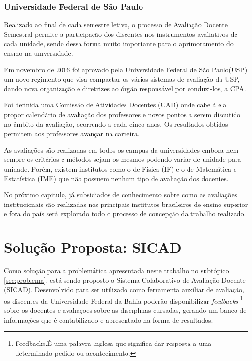 \documentclass[12pt, a4paper]{report}
\begin{document}
\subsection{Universidade Federal de São Paulo}

Realizado ao final de cada semestre letivo, o processo de Avaliação Docente Semestral permite a participação dos discentes nos instrumentos avaliativos de cada unidade, sendo dessa forma muito importante para o aprimoramento do ensino na universidade.

Em novembro de 2016 foi aprovado pela Universidade Federal de São Paulo(USP) um novo regimento que visa compactar os vários sistemas de avaliação da USP, dando nova organização e diretrizes ao órgão responsável por conduzi-los, a CPA.

Foi definida uma Comissão de Atividades Docentes (CAD) onde cabe à ela propor calendário de avaliação dos professores e novos pontos a serem discutido no âmbito da avaliação, ocorrendo a cada cinco anos. Os resultados obtidos permitem aos professores avançar na carreira.

As avaliações são realizadas em todos os campus da universidades embora nem sempre os critérios e métodos sejam os mesmos podendo variar de unidade para unidade. Porém, existem institutos como o de Física (IF) e o de Matemática e Estatística (IME) que não possuem nenhum tipo de avaliação dos docentes.

No próximo capitulo, já subsidiados de conhecimento sobre como as avaliações institucionais são realizadas nos principais institutos brasileiros de ensino superior e fora do país será explorado todo o processo de concepção da trabalho realizado.


\chapter{Solução Proposta: SICAD}
\label{chap:solucaoproposta}

Como solução para a problemática apresentada neste trabalho no subtópico \ref{sec:problema}, está sendo proposto o Sistema Colaborativo de Avaliação Docente (SICAD). Desenvolvido para ser utilizado como ferramenta auxiliar de avaliação, os discentes da Universidade Federal da Bahia poderão disponibilizar \textit{feedbacks} \footnote{Feedbacks.É uma palavra inglesa que significa dar resposta a uma determinado pedido ou acontecimento.} sobre os docentes e avaliações sobre as disciplinas cursadas, gerando um banco de informações que é contabilizado e apresentado na forma de resultados. 
\end{document}
